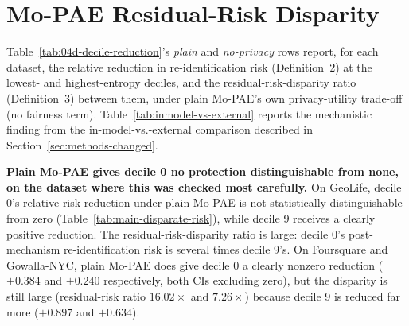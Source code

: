 \section{Mo-PAE Residual-Risk Disparity}
\label{sec:residual-risk}

Table~\ref{tab:04d-decile-reduction}'s \emph{plain} and \emph{no-privacy}
rows report, for each dataset, the relative reduction in
re-identification risk (Definition~2) at the lowest- and
highest-entropy deciles, and the residual-risk-disparity ratio
(Definition~3) between them, under plain Mo-PAE's own privacy-utility
trade-off (no fairness term). Table~\ref{tab:inmodel-vs-external}
reports the mechanistic finding from the in-model-vs.-external
comparison described in Section~\ref{sec:methods-changed}.




\textbf{Plain Mo-PAE gives decile 0 no protection distinguishable from
none, on the dataset where this was checked most carefully.} On
GeoLife, decile 0's relative risk reduction under plain Mo-PAE is not
statistically distinguishable from zero (Table~\ref{tab:main-disparate-risk}),
while decile 9 receives a clearly positive reduction. The
residual-risk-disparity ratio is large: decile 0's post-mechanism
re-identification risk is several times decile 9's. On Foursquare and
Gowalla-NYC, plain Mo-PAE does give decile 0 a clearly nonzero
reduction ($+0.384$ and $+0.240$ respectively, both CIs excluding
zero), but the disparity is still large (residual-risk ratio
$16.02\times$ and $7.26\times$) because decile 9 is reduced far more
($+0.897$ and $+0.634$).

